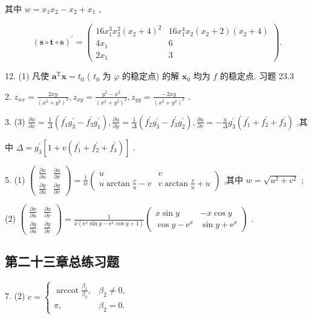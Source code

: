 其中 \(w = {x}_{1}{x}_{2} - {x}_{2} + {x}_{1}\) ,

\[
{\left( \mathbf{s} \circ  \mathbf{t} \circ  \mathbf{s}\right) }^{\prime } = \left( \begin{matrix} {16}{x}_{1}^{3}{x}_{2}^{2}{\left( {x}_{2} + 4\right) }^{2} & {16}{x}_{1}^{4}{x}_{2}\left( {{x}_{2} + 2}\right) \left( {{x}_{2} + 4}\right) \\  4{x}_{1} & 6 \\  2{x}_{1} & 3 \end{matrix}\right) .
\]

12. (1) 凡使 \({\mathbf{a}}^{\mathrm{T}}\mathbf{x} = {t}_{0}\) ( \({t}_{0}\) 为 \(\varphi\) 的稳定点) 的解 \({\mathbf{x}}_{0}\) 均为 \(f\) 的稳定点. 习题 23.3

2. \({z}_{xx} = \frac{2xy}{{\left( {x}^{2} + {y}^{2}\right) }^{2}},{z}_{xy} = \frac{{y}^{2} - {x}^{2}}{{\left( {x}^{2} + {y}^{2}\right) }^{2}},{z}_{yy} = \frac{-{2xy}}{{\left( {x}^{2} + {y}^{2}\right) }^{2}}\) .

3. (3) \(\frac{\partial u}{\partial x} = \frac{1}{\Delta }\left( {{f}_{1}^{\prime }{g}_{3}^{\prime } - {f}_{3}^{\prime }{g}_{1}^{\prime }}\right) ,\frac{\partial u}{\partial y} = \frac{1}{\Delta }\left( {{f}_{2}^{\prime }{g}_{3}^{\prime } - {f}_{3}^{\prime }{g}_{2}^{\prime }}\right) ,\frac{\partial u}{\partial v} =  - \frac{u}{\Delta }{g}_{3}^{\prime }\left( {{f}_{1}^{\prime } + {f}_{2}^{\prime } + {f}_{3}^{\prime }}\right)\) ,其

中 \(\Delta  = {g}_{3}^{\prime }\left\lbrack  {1 + v\left( {{f}_{1}^{\prime } + {f}_{2}^{\prime } + {f}_{3}^{\prime }}\right) }\right\rbrack\) .

5. (1) \(\left( \begin{array}{ll} \frac{\partial x}{\partial u} & \frac{\partial x}{\partial v} \\  \frac{\partial y}{\partial u} & \frac{\partial y}{\partial v} \end{array}\right)  = \frac{1}{w}\left( \begin{matrix} u & v \\  u\arctan \frac{v}{u} - v & v\arctan \frac{v}{u} + u \end{matrix}\right)\) ,其中 \(w = \sqrt{{u}^{2} + {v}^{2}}\) ;

(2) \(\left( \begin{array}{ll} \frac{\partial x}{\partial u} & \frac{\partial x}{\partial v} \\  \frac{\partial y}{\partial u} & \frac{\partial y}{\partial v} \end{array}\right)  = \frac{1}{x\left( {{\mathrm{e}}^{x}\sin y - {\mathrm{e}}^{x}\cos y + 1}\right) }\left( \begin{matrix} x\sin y &  - x\cos y \\  \cos y - {\mathrm{e}}^{x} & \sin y + {\mathrm{e}}^{x} \end{matrix}\right)\) .

\subsection{第二十三章总练习题}

7. (2) \(c = \left\{  \begin{matrix} \operatorname{arccot}\frac{{\beta }_{1}}{{\beta }_{2}}, & {\beta }_{2} \neq  0, \\  \pi , & {\beta }_{2} = 0. \end{matrix}\right.\)

